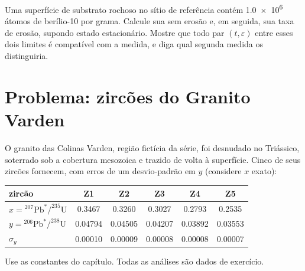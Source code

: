 \begin{exercise}[$\star\star\star$]\label{exo:b3:advanced-geochronology:12}
Uma superfície de substrato rochoso no sítio de referência contém \num{1.0e6} átomos de
berílio-10 por grama. Calcule sua  sem erosão e, em seguida, sua
taxa de erosão, supondo estado estacionário. Mostre que todo par $(t, \varepsilon)$
entre esses dois limites é compatível com a medida, e diga qual
segunda medida os distinguiria.
\end{exercise}

\section{Problema: zircões do Granito Varden}

\begin{problem}\label{pb:b3:advanced-geochronology:1}
O granito das Colinas Varden, região fictícia da série, foi desnudado
no Triássico, soterrado sob a cobertura mesozoica e trazido de volta à
superfície. Cinco de seus zircões fornecem, com erros de um desvio-padrão em $y$
(considere $x$ exato):
\begin{center}
\small
\begin{tabular}{|l|ccccc|}
\hline
zircão & Z1 & Z2 & Z3 & Z4 & Z5 \\
\hline
$x = {}^{207}\mathrm{Pb}^*/^{235}\mathrm U$ & 0.3467 & 0.3260 & 0.3027 & 0.2793 & 0.2535 \\
$y = {}^{206}\mathrm{Pb}^*/^{238}\mathrm U$ & 0.04794 & 0.04505 & 0.04207 & 0.03892 & 0.03553 \\
$\sigma_y$ & 0.00010 & 0.00009 & 0.00008 & 0.00008 & 0.00007 \\
\hline
\end{tabular}
\end{center}
Use as constantes do capítulo. Todas as análises são dados de exercício.


\end{problem}
